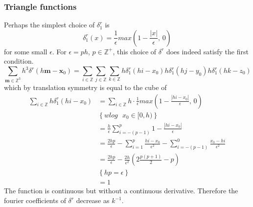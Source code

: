 \documentclass[a4paper,
twoside=false,abstract=false,numbers=noenddot,
titlepage=false,headings=small,parskip=half,version=last]{scrartcl}
\begin{document}
\subsubsection{Triangle functions}\label{section:triangle-delta}
Perhaps the simplest choice of $\delta^{r}_{1}$ is
\begin{equation}
\delta^{r}_{1}(x) = \frac{1}{\epsilon}max\left(1-\frac{|x|}{\epsilon}\text{, }0\right)
\end{equation}
for some small $\epsilon$.
For $\epsilon=ph$, $p\in\mathbb{Z}^+$, this choice of $\delta^r$ does indeed satisfy the first condition.
\begin{equation}
\sum_{\mathbf{m}\in\mathbb{Z}^3}h^3\delta^{r}(h\mathbf{m}-\mathbf{x}_0)	= \sum_{i\in \mathbb{Z}}\sum_{j\in \mathbb{Z}}\sum_{k\in \mathbb{Z}}h\delta^{r}_1(hi-x_0)h\delta^{r}_1(hj-y_0)h\delta^{r}_1(hk-z_0)\label{eq:splitdelta3dto1d}
\end{equation}
which by translation symmetry is equal to the cube of
\begin{align}
\sum_{i\in \mathbb{Z}}h\delta^{r}_1(hi-x_0) &= \sum_{i\in \mathbb{Z}}h\cdot \frac{1}{\epsilon}max\left(1-\frac{|hi-x_0|}{\epsilon}\text{, }0\right)\nonumber\\
		& \left\{ wlog \text{ }x_0\in [0,h) \right\}\nonumber\\
		&= \frac{h}{\epsilon} \sum_{i=-(p-1)}^p 1-\frac{|hi-x_0|}{\epsilon}\nonumber\\
		&= \frac{2hp}{\epsilon} - \sum_{i=1}^p\frac{hi-x_0}{\epsilon^2} - \sum_{i=-(p-1)}^0\frac{x_0-hi}{\epsilon^2}\nonumber\\
		&= \frac{2hp}{\epsilon} - \frac{2h}{\epsilon^2}\left(2\frac{p(p+1)}{2} - p \right)\nonumber\\
		& \left\{ hp = \epsilon \right\}\nonumber\\
		&= 1\nonumber
\end{align}
The function is continuous but without a continuous derivative.
Therefore the fourier coefficients of $\delta^r$ decrease as $k^{-1}$.

\end{document}
